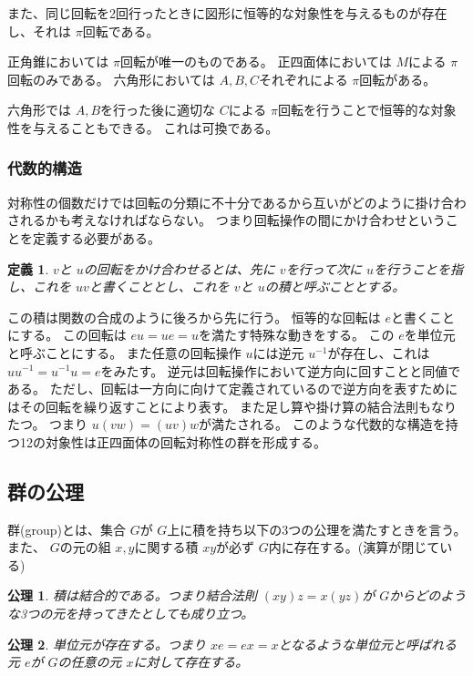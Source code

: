 \documentclass[dvipdfmx]{jsarticle}
\newtheorem{defi}{定義}
\newtheorem{axio}{公理}
\begin{document}
また、同じ回転を2回行ったときに図形に恒等的な対象性を与えるものが存在し、それは $\pi$回転である。

正角錐においては $\pi$回転が唯一のものである。
正四面体においては $M$による $\pi$回転のみである。
六角形においては $A,B,C$それぞれによる $\pi$回転がある。

六角形では $A,B$を行った後に適切な $C$による $\pi$回転を行うことで恒等的な対象性を与えることもできる。
これは可換である。

\subsubsection{代数的構造}
対称性の個数だけでは回転の分類に不十分であるから互いがどのように掛け合わされるかも考えなければならない。
つまり回転操作の間にかけ合わせということを定義する必要がある。

\begin{defi}
$v$と $u$の回転をかけ合わせるとは、先に $v$を行って次に $u$を行うことを指し、これを $uv$と書くこととし、これを $v$と $u$の積と呼ぶこととする。
\end{defi}

この積は関数の合成のように後ろから先に行う。
恒等的な回転は $e$と書くことにする。
この回転は $eu = ue = u$を満たす特殊な動きをする。
この $e$を単位元と呼ぶことにする。
また任意の回転操作 $u$には逆元 $u^{-1}$が存在し、これは
$uu^{-1} = u^{-1}u = e$をみたす。
逆元は回転操作において逆方向に回すことと同値である。
ただし、回転は一方向に向けて定義されているので逆方向を表すためにはその回転を繰り返すことにより表す。
また足し算や掛け算の結合法則もなりたつ。
つまり $u(vw) = (uv)w$が満たされる。
このような代数的な構造を持つ12の対象性は正四面体の回転対称性の群を形成する。

\subsection{群の公理}

群(group)とは、集合 $G$が $G$上に積を持ち以下の3つの公理を満たすときを言う。
また、 $G$の元の組 $x,y$に関する積 $xy$が必ず $G$内に存在する。(演算が閉じている)

\begin{axio}
  積は結合的である。つまり結合法則 $(xy)z = x(yz)$が $G$からどのような3つの元を持ってきたとしても成り立つ。
\end{axio}

\begin{axio}
  単位元が存在する。つまり $xe = ex =x$となるような単位元と呼ばれる元 $e$が $G$の任意の元 $x$に対して存在する。
\end{axio}
\end{document}
